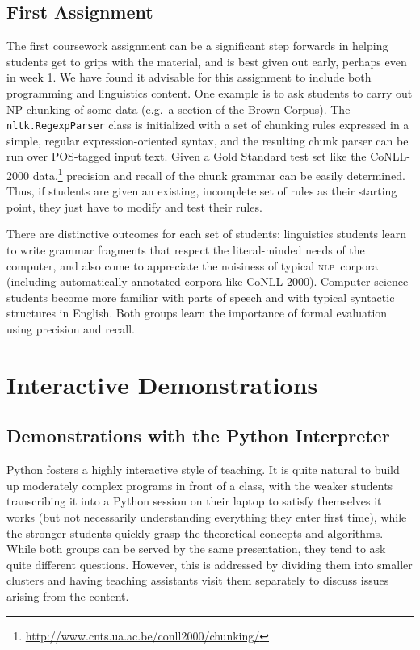 \documentclass[11pt]{article}
\newcommand{\NLP}{\textsc{nlp}}
\newcommand{\code}[1]{\texttt{\small #1}}
\begin{document}
\subsection{First Assignment}

The first coursework assignment can be a significant step forwards in
helping students get to grips with the material, and is best given out
early, perhaps even in week 1.  We have found it advisable for this
assignment to include both programming and linguistics content. One
example is to ask students to carry out NP chunking of some data
(e.g.\ a section of the Brown Corpus). The \code{nltk.RegexpParser}
class is initialized with a set of chunking rules expressed in a
simple, regular expression-oriented syntax, and the resulting chunk
parser can be run over POS-tagged input text. Given a Gold Standard
test set like the CoNLL-2000
data,\footnote{\url{http://www.cnts.ua.ac.be/conll2000/chunking/}}
precision and recall of the chunk grammar can be easily determined.
Thus, if students are given an existing, incomplete set of rules as
their starting point, they just have to modify and test their rules.

There are distinctive outcomes for each set of students: linguistics students
learn to write grammar fragments that respect the literal-minded
needs of the computer, and also come to appreciate the noisiness of
typical \NLP\ corpora (including automatically annotated corpora like
CoNLL-2000).
Computer science students become more familiar with parts of speech
and with typical syntactic structures in English. Both groups learn
the importance of formal evaluation using precision and recall.

\section{Interactive Demonstrations}
\label{sec:interactive-demonstrations}

\subsection{Demonstrations with the Python Interpreter}

Python fosters a highly interactive style of teaching.  It is quite
natural to build up moderately complex programs in front of a class,
with the weaker students transcribing it into a Python session on
their laptop to satisfy themselves it works (but not necessarily
understanding everything they enter first time), while the stronger
students quickly grasp the theoretical concepts and algorithms.  While
both groups can be served by the same presentation, they tend to ask
quite different questions.  However, this is addressed by dividing
them into smaller clusters and having teaching assistants visit them
separately to discuss issues arising from the content.
\end{document}

